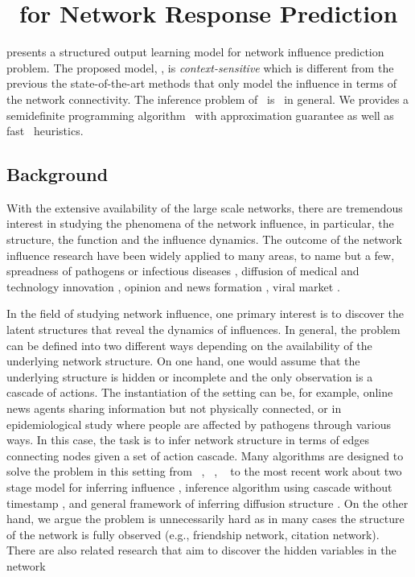 {%
%
\section{\spin\ for Network Response Prediction} \label{sc_su14a}

 presents a structured output learning model for network influence prediction problem.
The proposed model, \spin, is \textit{context-sensitive} which is different from the previous the state-of-the-art methods that only model the influence in terms of the network connectivity.
The inference problem of \spin\ is \nphard\ in general.
We provides a semidefinite programming algorithm \sdp\ with approximation guarantee as well as fast \greedy\ heuristics.

\subsection{Background}

With the extensive availability of the large scale networks, there are tremendous interest in studying the phenomena of the network influence, in particular, the structure, the function and the influence dynamics. 
The outcome of the network influence research have been widely applied to many areas, to name but a few, spreadness of pathogens or infectious diseases \citep{Hethcote00the,Anderson02infectious}, diffusion of medical and technology innovation \citep{Strang98diffusion,Rogers03the}, opinion and news formation \citep{Adar04implicit,Gruhl04information,Adar05tracking,Leskovec07cascading,Nowell08tracing,Leskovec09meme}, viral market \citep{Domingos01mining,Kempe03maximizing,Liben-Nowell03the}.

In the field of studying network influence, one primary interest is to discover the latent structures that reveal the dynamics of influences.
In general, the problem can be defined into two different ways depending on the availability of the underlying network structure.
On one hand, one would assume that the underlying structure is hidden or incomplete and the only observation is a cascade of actions.
The instantiation of the setting can be, for example, online news agents sharing information but not physically connected, or in epidemiological study where people are affected by pathogens through various ways.
In this case, the task is to infer network structure in terms of edges connecting nodes given a set of action cascade.
Many algorithms are designed to solve the problem in this setting from \netinf\ \citep{GomezRodriguez10inferring}, \netrate\ \citep{Rodrigues11unconvering}, \ \citep{Du12learning} to the most recent work about two stage model for inferring influence \citep{Du14influence}, inference algorithm using cascade without timestamp \citep{Amin14learning}, and general framework of inferring diffusion structure \citep{Daneshmand14estimating}.
On the other hand, we argue the problem is unnecessarily hard as in many cases the structure of the network is fully observed (e.g., friendship network, citation network).
There are also related research that aim to discover the hidden variables in the network \citep{Lovrek08prediction,Goyal10learning}

}
